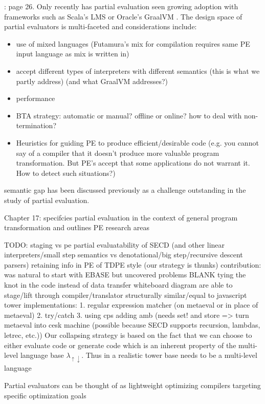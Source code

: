 \documentclass{article}
\theoremstyle{definition}
\newcommand{\mslang}{$\lambda_{\uparrow\downarrow}$}
\begin{document}
\cite{jones1993partial}: page 26. Only recently has partial evaluation seen growing adoption with frameworks such as Scala's LMS \cite{rompf2010lightweight} or Oracle's GraalVM \cite{wurthinger2013one}. The design space of partial evaluators is multi-faceted and considerations include:
\begin{itemize}
	\item use of mixed languages (Futamura's mix for compilation requires same PE input language as mix is written in)
	\item accept different types of interpreters with different semantics (this is what we partly address) (and what GraalVM addresses?)
	\item performance
	\item BTA strategy: automatic or manual? offline or online? how to deal with non-termination?
	\item Heuristics for guiding PE to produce efficient/desirable code (e.g. you cannot say of a compiler that it doesn't produce more valuable program transformation. But PE's accept that some applications do not warrant it. How to detect such situations?)
\end{itemize}

semantic gap has been discussed previously as a challenge outstanding in the study of partial evaluation.

Chapter 17: specifcies partial evaluation in the context of general program transformation and outlines PE research areas

TODO:
staging vs pe
partial evaluatability of SECD (and other linear interpreters/small step semantics vs denotational/big step/recursive descent parsers)
retaining info in PE of TDPE style (our strategy is thunks)
contribution: was natural to start with EBASE but uncovered problems BLANK
tying the knot in the code instead of data
transfer whiteboard diagram
are able to stage/lift through compiler/translator
structurally similar/equal to javascript tower
implementations:
	1. regular expression matcher (on metaeval or in place of metaeval)
	2. try/catch
	3. using cps adding amb (needs set! and store => turn metaeval into cesk machine (possible because SECD supports recursion, lambdas, letrec, etc.))
Our collapsing strategy is based on the fact that we can choose to either evaluate code or generate code which is an inherent property of the multi-level language base \mslang. Thus in a realistic tower base needs to be a multi-level language

Partial evaluators can be thought of as lightweight optimizing compilers targeting specific optimization goals
\end{document}
